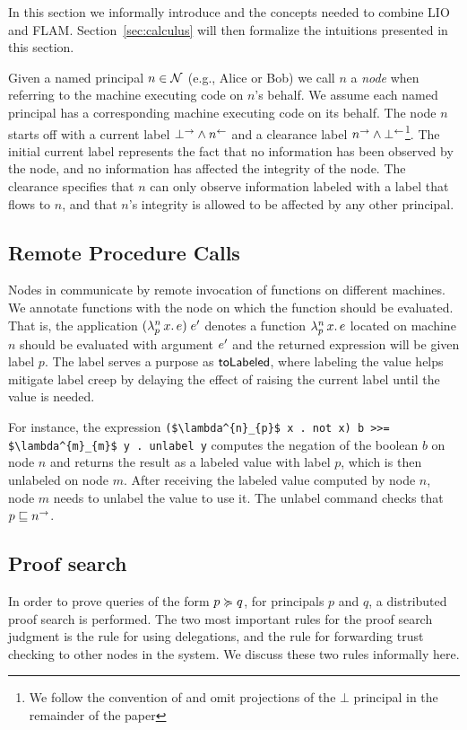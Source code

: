 In this section we informally introduce \lang{} and the concepts needed to combine LIO and FLAM. Section~\ref{sec:calculus} will then formalize the intuitions presented in this section.

Given a named principal $n \in \mathcal{N}$ (e.g., Alice or Bob) we call $n$ a \emph{node} when referring to the machine executing code on $n$'s behalf. We assume each named principal has a corresponding machine executing code on its behalf. The node $n$ starts off with a current label $\bot^{\rightarrow} \wedge n^{\leftarrow}$ and a clearance label $n^{\rightarrow} \wedge \bot^{\leftarrow}$\footnote{We follow the convention of \cite{Arden:2015:FA:2859845.2859998} and omit projections of the $\bot$ principal in the remainder of the paper}. The initial current label represents the fact that no information has been observed by the node, and no information has affected the integrity of the node. The clearance specifies that $n$ can only observe information labeled with a label that flows to $n$, and that $n$'s integrity is allowed to be affected by any other principal.

\subsection{Remote Procedure Calls}
Nodes in \lang{} communicate by remote invocation of functions on different machines. We annotate functions with the node on which the function should be evaluated. That is, the application $(\lambda^{n}_{p}\,x.\,e)\;e'$ denotes a function $\lambda^{n}_{p}\,x.\,e$ located on machine $n$ should be evaluated with argument $e'$ and the returned expression will be given label $p$. The label serves a purpose as $\mathsf{toLabeled}$, where labeling the value helps mitigate label creep by delaying the effect of raising the current label until the value is needed.

For instance, the expression \lstinline[mathescape]!($\lambda^{n}_{p}$ x . not x) b >>= $\lambda^{m}_{m}$ y . unlabel y!
computes the negation of the boolean $b$ on node $n$ and returns the result as a labeled value with label $p$, which is then unlabeled on node $m$. After receiving the labeled value computed by node $n$, node $m$ needs to unlabel the value to use it. The unlabel command checks that $p \sqsubseteq n^{\rightarrow}$.

\subsection{Proof search}
In order to prove queries of the form $p \succcurlyeq q$, for principals $p$ and $q$, a distributed proof search is performed. The two most important rules for the proof search judgment is the rule for using delegations, and the rule for forwarding trust checking to other nodes in the system. We discuss these two rules informally here.

